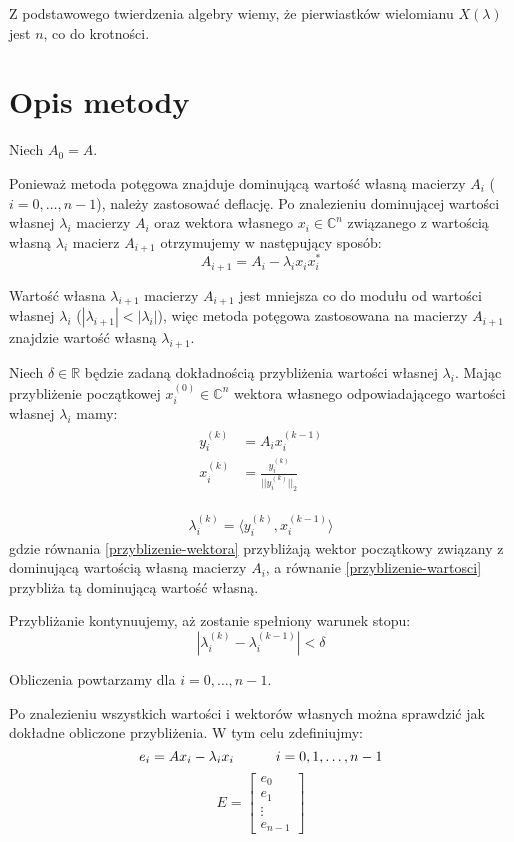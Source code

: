 \documentclass[12pt]{article}
\begin{document}
	Z podstawowego twierdzenia algebry wiemy, że pierwiastków wielomianu $X(\lambda)$ jest $n$, co do krotności.
	
	
	\section{Opis metody}
	Niech $A_0 = A$.
	
	Ponieważ metoda potęgowa znajduje dominującą wartość własną macierzy $A_i$ ($i = 0, \dots, n-1$), należy zastosować deflację. Po znalezieniu dominującej wartości własnej $\lambda_i$ macierzy $A_i$ oraz wektora własnego $x_i \in \mathbb{C}^n$ związanego z wartością własną $\lambda_i$ macierz $A_{i+1}$ otrzymujemy w następujący sposób:
	$$ A_{i+1} = A_i - \lambda_i x_i x_i^* $$
	
	Wartość własna $\lambda_{i+1}$ macierzy $A_{i+1}$ jest mniejsza co do modułu od wartości własnej $\lambda_i$ ($|\lambda_{i+1}| < |\lambda_i|$), więc metoda potęgowa zastosowana na macierzy $A_{i+1}$ znajdzie wartość własną $\lambda_{i+1}$.
	
	Niech $\delta \in \mathbb{R}$ będzie zadaną dokładnością przybliżenia wartości własnej $\lambda_i$. Mając przybliżenie początkowej $x_i^{(0)} \in \mathbb{C}^n$ wektora własnego odpowiadającego wartości własnej $\lambda_i$ mamy:
	\begin{align}
		\begin{split}
			\label{przyblizenie-wektora}
			y_i^{(k)}       & = A_i x_i^{(k-1)} \\
			x_i^{(k)}       & = \frac{y_i^{(k)}}{|| y_i^{(k)} ||_2}
		\end{split}
	\end{align}

	\begin{align}
		\label{przyblizenie-wartosci}
		\lambda_i^{(k)} = \langle y_i^{(k)}, x_i^{(k-1)} \rangle
	\end{align}
	gdzie równania \eqref{przyblizenie-wektora} przybliżają wektor początkowy związany z dominującą wartością własną macierzy $A_i$, a równanie \eqref{przyblizenie-wartosci} przybliża tą dominującą wartość własną.
	
	Przybliżanie kontynuujemy, aż zostanie spełniony warunek stopu:
	$$ | \lambda_i^{(k)} - \lambda_i^{(k-1)} | < \delta $$
	
	Obliczenia powtarzamy dla $i = 0, \dots, n-1$.
	
	Po znalezieniu wszystkich wartości i wektorów własnych można sprawdzić jak dokładne obliczone przybliżenia. W tym celu zdefiniujmy:
	$$e_i = A x_i - \lambda_i x_i \hspace{30px} i = 0, 1, \dots, n-1$$
	\begin{equation*}
		E = 
		\begin{bmatrix}
			e_0     \\
			e_1     \\
			\vdots  \\
			e_{n-1}
		\end{bmatrix}
	\end{equation*}
	
\end{document}
